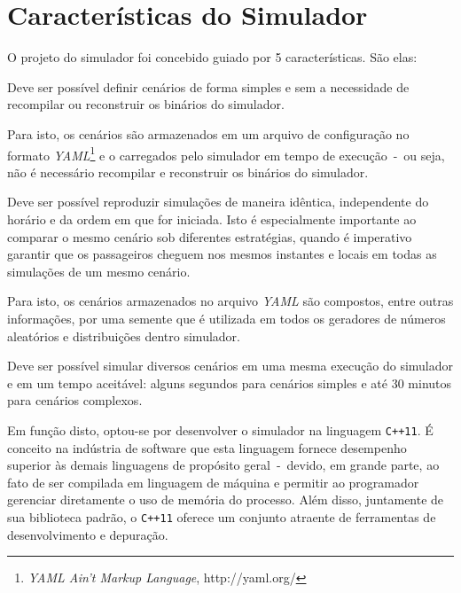 \section{\label{sec:simulator:traits}Características do Simulador}

O projeto do simulador foi concebido guiado por 5 características. São elas:

\begin{description}[leftmargin=!,labelwidth=\widthof{\bfseries Determinístico}]
  \item[Configurável]

  Deve ser possível definir cenários de forma simples e sem a necessidade de
  recompilar ou reconstruir os binários do simulador.


  Para isto, os cenários   são armazenados em um arquivo de configuração no
  formato   \textit{YAML}\footnote{\textit{YAML Ain't Markup Language},
  http://yaml.org/}   e o carregados pelo simulador em tempo de execução~-~ou
  seja, não é necessário   recompilar e reconstruir os binários do simulador.

  \item[Determinístico]

  Deve ser possível reproduzir simulações de maneira idêntica, independente do
  horário e da ordem em que for iniciada. Isto é especialmente importante ao
  comparar o mesmo cenário sob diferentes estratégias, quando é imperativo
  garantir que os passageiros cheguem nos mesmos instantes e locais em todas as
  simulações de um mesmo cenário.

  Para isto, os cenários armazenados no   arquivo \textit{YAML} são compostos,
  entre outras informações, por uma semente   que é utilizada em todos os
  geradores de números aleatórios e distribuições   dentro simulador.

  \item[Escalável]

  Deve ser possível simular diversos cenários em uma mesma execução do simulador
  e em um tempo aceitável: alguns segundos para cenários simples e até 30
  minutos para cenários complexos.

  Em função disto, optou-se por desenvolver o simulador na linguagem
  \texttt{C++11}. É conceito na indústria de software que esta linguagem fornece
  desempenho superior às demais linguagens de propósito geral~-~devido, em
  grande parte, ao fato de ser compilada em linguagem de máquina e permitir ao
  programador gerenciar diretamente o uso de memória do processo. Além disso,
  juntamente de sua biblioteca padrão, o \texttt{C++11} oferece um conjunto
  atraente de ferramentas de desenvolvimento e depuração.


\end{description}
